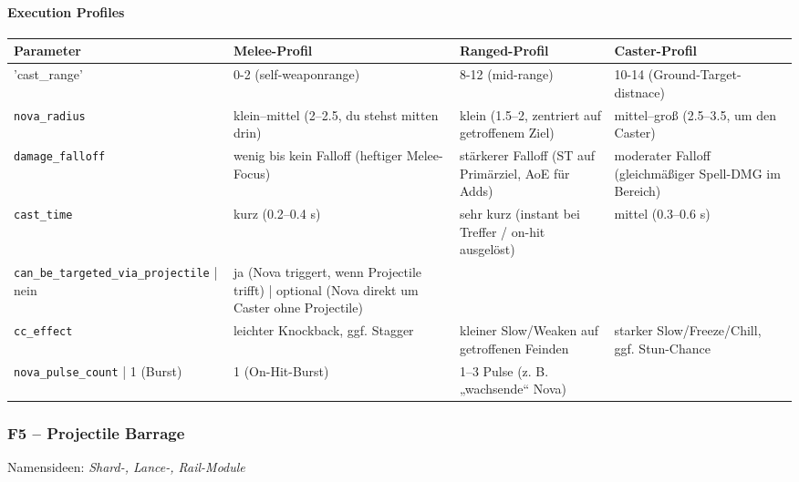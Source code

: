 \paragraph{Execution Profiles}{}
\scriptsize %
\begin{tabular}{p{3cm} | p{4cm} | p{4cm} | p{4cm}}
	Parameter         & Melee-Profil                                             & Ranged-Profil                                                & Caster-Profil                                                    \\
	\hline
	'cast\_range'        & 0-2 (self-weaponrange)                                   & 8-12 (mid-range)                                 & 10-14 (Ground-Target-distnace)  \\
	\texttt{nova\_radius}     & klein–mittel (2–2.5, du stehst mitten drin)             & klein (1.5–2, zentriert auf getroffenem Ziel)               & mittel–groß (2.5–3.5, um den Caster)                             \\
	\texttt{damage\_falloff}  & wenig bis kein Falloff (heftiger Melee-Focus)           & stärkerer Falloff (ST auf Primärziel, AoE für Adds)         & moderater Falloff (gleichmäßiger Spell-DMG im Bereich)          \\
	\texttt{cast\_time}       & kurz (0.2–0.4 s)                                        & sehr kurz (instant bei Treffer / on-hit ausgelöst)          & mittel (0.3–0.6 s)                                              \\
	\texttt{can\_be\_targeted\_via\_projectile} | nein                                     & ja (Nova triggert, wenn Projectile trifft)                  | optional (Nova direkt um Caster ohne Projectile)               \\
	\texttt{cc\_effect}       & leichter Knockback, ggf. Stagger                        & kleiner Slow/Weaken auf getroffenen Feinden                 & starker Slow/Freeze/Chill, ggf. Stun-Chance                    \\
	\texttt{nova\_pulse\_count} | 1 (Burst)                                               & 1 (On-Hit-Burst)                                             & 1–3 Pulse (z. B. „wachsende“ Nova)                             \\
	\hline
\end{tabular}
\normalsize
\subsubsection{F5 – Projectile Barrage}
Namensideen: \emph{Shard-, Lance-, Rail-Module}

